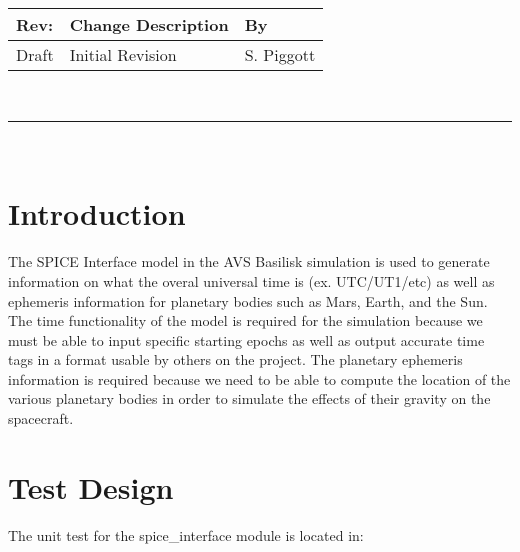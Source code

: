 \documentclass[]{LASPreport}
\begin{document}
\makeCover


%
%
\pagestyle{empty}
{\renewcommand{\arraystretch}{2}
\noindent
\begin{longtable}{|p{0.5in}|p{4.5in}|p{1.14in}|}
\hline
{\bfseries Rev}: & {\bfseries Change Description} & {\bfseries By} \\
\hline
Draft & Initial Revision & S. Piggott \\
\hline

\end{longtable}
}

\newpage
\setcounter{page}{1}
\pagestyle{fancy}

\tableofcontents
~\\ \hrule ~\\


\section{Introduction}
The SPICE Interface model in the AVS Basilisk simulation is used to generate 
information on what the overal universal time is (ex. UTC/UT1/etc) as well as 
ephemeris information for planetary bodies such as Mars, Earth, and the Sun.  
The time functionality of the model is required for the simulation because we 
must be able to input specific starting epochs as well as output accurate time 
tags in a format usable by others on the project.  The planetary ephemeris 
information is required because we need to be able to compute the location of 
the various planetary bodies in order to simulate the effects of their gravity 
on the spacecraft.


\section{Test Design}
The unit test for the spice\_interface module is located in:\\
\end{document}
